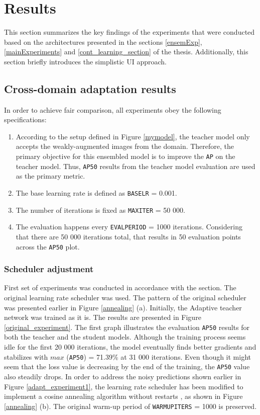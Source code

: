 

\section{Results} 
\label{results} 
This section summarizes the key findings of the experiments that were conducted based on the architectures presented in the sections \ref{ensemExp},  \ref{mainExperiments} and \ref{cont_learning_section} of the thesis. Additionally, this section briefly introduces the simplistic UI approach. 

\subsection{Cross-domain adaptation results}

In order to achieve fair comparison, all experiments obey the following specifications:
\begin{enumerate}
\item According to the setup defined in Figure \ref{mymodel}, the teacher model only accepts the weakly-augmented images from the  domain. Therefore, the primary objective for this ensembled model is to improve the \texttt{AP} on the teacher model. Thus, \texttt{AP50} results from the teacher model evaluation are used as the primary metric. 
\item The base learning rate is defined as \texttt{BASE\textunderscore LR} = 0.001.
\item The number of iterations is fixed as \texttt{MAX\textunderscore ITER} = 50 000.
\item The evaluation happens every \texttt{EVAL\textunderscore PERIOD} = 1000 iterations. Considering that there are 50 000 iterations total, that results in 50 evaluation points across the \texttt{AP50} plot.
\end{enumerate}  
\subsubsection{Scheduler adjustment}
\label{scheduler_section} 
First set of experiments was conducted in accordance with the  section. The original learning rate scheduler was used. The pattern of the original scheduler was presented earlier in Figure \ref{annealing} (a). Initially, the Adaptive teacher network was trained as it is. The results are presented in Figure \ref{original_experiment}. The first graph illustrates the evaluation \texttt{AP50} results for both the teacher and the student models. Although the training process seems idle for the first 20 000 iterations, the model eventually finds better gradients and stabilizes with $max$ (\texttt{AP50}) = 71.39\% at 31 000 iterations. Even though it might seem that the loss value is decreasing by the end of the training, the \texttt{AP50} value also steadily drops. In order to address the noisy predictions shown earlier in Figure \ref{adapt_experiment1}, the learning rate scheduler has been modified to implement a cosine annealing algorithm without restarts \cite{Loshchilov2016}, as shown in Figure \ref{annealing} (b). The original warm-up period of \texttt{WARMUP\textunderscore ITERS} = 1000 is preserved. 


